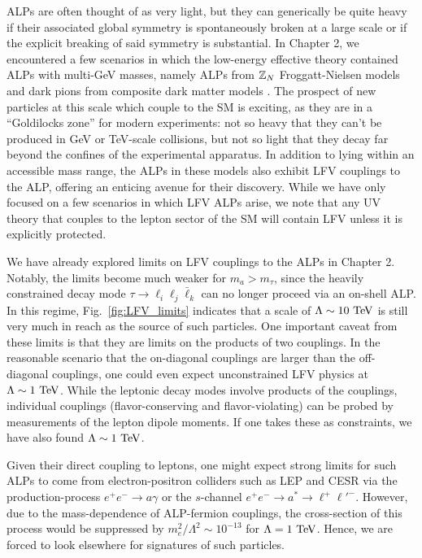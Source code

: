 ALPs are often thought of as very light, but they can generically be quite heavy if their associated global symmetry is spontaneously broken at a large scale or if the explicit breaking of said symmetry is substantial. In Chapter 2, we encountered a few scenarios in which the low-energy effective theory contained ALPs with multi-GeV masses, namely ALPs from ${\Bbb Z}_N$ Froggatt-Nielsen models \cite{Greljo:2024evt} and dark pions from composite dark matter models \cite{Davoudiasl:2017zws}. The prospect of new particles at this scale which couple to the SM is exciting, as they are in a ``Goldilocks zone'' for modern experiments: not so heavy that they can't be produced in GeV or TeV-scale collisions, but not so light that they decay far beyond the confines of the experimental apparatus. In addition to lying within an accessible mass range, the ALPs in these models also exhibit LFV couplings to the ALP, offering an enticing avenue for their discovery. While we have only focused on a few scenarios in which LFV ALPs arise, we note that any UV theory that couples to the lepton sector of the SM will contain LFV unless it is explicitly protected.

We have already explored limits on LFV couplings to the ALPs in Chapter 2. Notably, the limits become much weaker for $m_a > m_\tau$, since the heavily constrained decay mode $\tau \rightarrow \ell_i\ell_j\bar{\ell}_k$ can no longer proceed via an on-shell ALP. In this regime, Fig.~\ref{fig:LFV_limits} indicates that a scale of $\Lambda \sim 10~{\rm TeV}$ is still very much in reach as the source of such particles. One important caveat from these limits is that they are limits on the products of two couplings. In the reasonable scenario that the on-diagonal couplings are larger than the off-diagonal couplings, one could even expect unconstrained LFV physics at $\Lambda \sim 1~{\rm TeV}$. While the leptonic decay modes involve products of the couplings, individual couplings (flavor-conserving and flavor-violating) can be probed by measurements of the lepton dipole moments. If one takes these as constraints, we have also found  $\Lambda \sim 1~{\rm TeV}$. 

Given their direct coupling to leptons, one might expect strong limits for such ALPs to come from electron-positron colliders such as LEP and CESR via the production-process $e^+ e^- \rightarrow a \gamma$ or the $s$-channel $e^+ e^- \rightarrow a^*\rightarrow \ell^+ \ell'^-$. However, due to the mass-dependence of ALP-fermion couplings, the cross-section of this process would be suppressed by $m_e^2/\Lambda^2 \sim 10^{-13}$ for $\Lambda = 1~{\rm TeV}$. Hence, we are forced to look elsewhere for signatures of such particles. 

